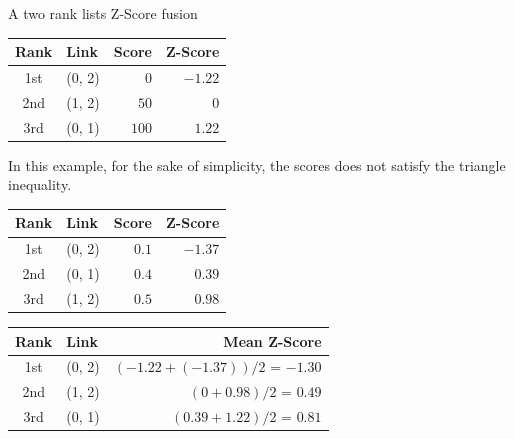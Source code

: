 \begin{example}
  \caption{A two rank lists Z-Score fusion}
  \label{ex:z_score_fusion}

  \begin{subexample}{\linewidth}
    \centering
    \begin{tabular}{c l r r}
      \toprule
      Rank & Link & Score & Z-Score \\
      \midrule
      1st & (0, 2) & $0$ & $-1.22$ \\
      2nd & (1, 2) & $50$ & $0$ \\
      3rd & (0, 1) & $100$ & $1.22$ \\
      \bottomrule
    \end{tabular}
  \end{subexample}

  \vspace{0.5cm}

  In this example, for the sake of simplicity, the scores does not satisfy the triangle inequality.

  \vspace{0.5cm}

  \begin{subexample}{\linewidth}
    \centering
    \begin{tabular}{c l r r}
      \toprule
      Rank & Link & Score & Z-Score \\
      \midrule
      1st & (0, 2) & $0.1$ & $-1.37$ \\
      2nd & (0, 1) & $0.4$ & $0.39$ \\
      3rd & (1, 2) & $0.5$ & $0.98$ \\
      \bottomrule
    \end{tabular}
  \end{subexample}

  \vspace{0.5cm}

  \begin{subexample}{\linewidth}
    \centering
    \begin{tabular}{c l r}
      \toprule
      Rank & Link & Mean Z-Score \\
      \midrule
      1st & (0, 2) & $(-1.22 + (-1.37)) / 2$ = $-1.30$ \\
      2nd & (1, 2) & $(0 + 0.98) / 2$ = $0.49$ \\
      3rd & (0, 1) & $(0.39 + 1.22) / 2$ = $0.81$ \\
      \bottomrule
    \end{tabular}
  \end{subexample}

\end{example}

